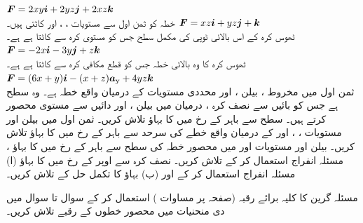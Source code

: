  \quad
\({{\boldsymbol{F}}}=2xy{\boldsymbol{i}}+2yz{\boldsymbol{j}}+2xz{\boldsymbol{k}}\)\\
خطہ    کو ثمن اول سے  مستویات ، ، اور  کاٹتی ہیں۔
\quad
\({{\boldsymbol{F}}}=xz{\boldsymbol{i}}+yz{\boldsymbol{j}}+{\boldsymbol{k}}\)\\
ٹھوس کرہ   کے  اس بالائی ٹوپی کی  مکمل سطح  جس کو   مستوی    کرہ  سے کاٹتا ہے  ہے۔
\quad
\({{\boldsymbol{F}}}=-2x{\boldsymbol{i}}-3y{\boldsymbol{j}}+z{\boldsymbol{k}}\)\\
ٹھوس کرہ   کا وہ  بالائی خطہ    جس کو قطع مکافی     کرہ  سے کاٹتا ہے  ہے۔
\quad 
\({{\boldsymbol{F}}}=(6x+y){\boldsymbol{i}}-(x+z){\boldsymbol{a}}_{\textup{y}}+4yz{\boldsymbol{k}}\)\\
ثمن اول میں  مخروط ، بیلن ، اور  محددی مستویات کے درمیان واقع خطہ  ہے۔
\quad {} وہ سطح ہے  جس کو بائیں سے نصف کرہ ، درمیان  میں  بیلن ، اور  دائیں سے  مستوی   محصور کرتے ہیں۔ سطح  سے باہر  کے رخ  میں  کا بہاؤ تلاش کریں۔
\quad 
ثمن اول میں بیلن   اور مستویات ، ، اور  کے درمیان واقع  خطے کی سرحد سے باہر کے  رخ  میں   کا بہاؤ تلاش کریں۔
\quad 
بیلن  اور مستویات  اور   میں محصور  خطہ کی سطح 
 سے باہر  کے  رخ  میں  کا بہاؤ ، مسئلہ انفراج  استعمال کر کے  تلاش کریں۔
\wf{\unexpanded{
$\pi$
}}
 \quad 
نصف کرہ  سے اوپر کے  رخ  میں  کا بہاؤ (ا) مسئلہ انفراج استعمال کر کے اور (ب) بہاؤ کا تکمل   حل  کے تلاش کریں۔


\setcounter{questioncounter}{0}

مسئلہ گرین  کا کلیہ برائے رقبہ (صفحہ   پر مساوات ) استعمال  کر کے سوال   تا سوال   میں  دی منحنیات میں محصور خطوں کے رقبے تلاش کریں۔

